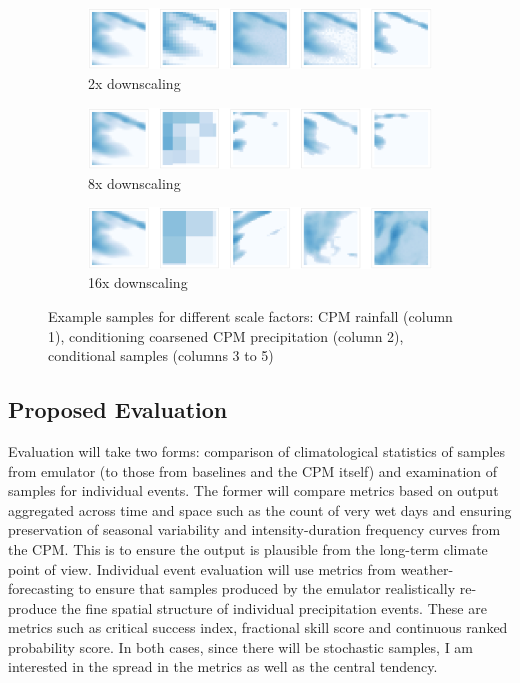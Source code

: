 \begin{figure}[hp]
    \begin{subfigure}{1.0\textwidth}
        \includegraphics[width=1.0\linewidth]{../figures/modelling/2x-samples.png}
        \caption{2x downscaling}
    \end{subfigure}

    \begin{subfigure}{1.0\textwidth}
        \includegraphics[width=1.0\linewidth]{../figures/modelling/8x-samples.png}
        \caption{8x downscaling}
    \end{subfigure}

    \begin{subfigure}{1.0\textwidth}
        \includegraphics[width=1.0\linewidth]{../figures/modelling/16x-samples.png}
        \caption{16x downscaling}
    \end{subfigure}

    \caption{Example samples for different scale factors: CPM rainfall (column 1), conditioning coarsened CPM precipitation (column 2), conditional samples (columns 3 to 5)}
    \label{fig:modelling:prelim-samples}
\end{figure}

\subsection{Proposed Evaluation}

Evaluation will take two forms: comparison of climatological statistics of samples from emulator (to those from baselines and the CPM itself) and examination of samples for individual events. The former will compare metrics based on output aggregated across time and space such as the count of very wet days and ensuring preservation of seasonal variability and intensity-duration frequency curves from the CPM. This is to ensure the output is plausible from the long-term climate point of view. Individual event evaluation will use metrics from weather-forecasting to ensure that samples produced by the emulator realistically re-produce the fine spatial structure of individual precipitation events. These are metrics such as critical success index, fractional skill score and continuous ranked probability score. In both cases, since there will be stochastic samples, I am interested in the spread in the metrics as well as the central tendency.

